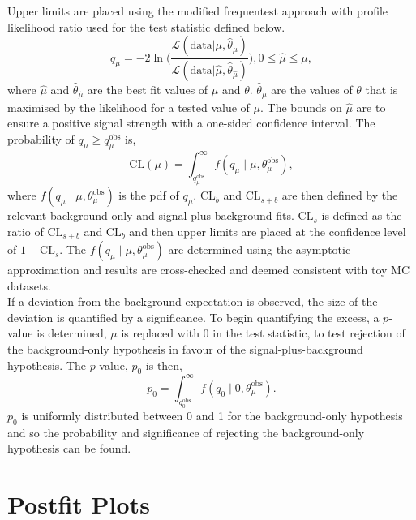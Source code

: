 Upper limits are placed using the modified frequentest approach \cite{Junk:1999kv,Read:2002hq} with profile likelihood ratio used for the test statistic defined below.
\begin{equation}
  q_{\mu} = -2 \ln \Biggl(\frac{\mathcal{L}(\text{data} | \mu, \hat{\theta}_{\mu})}{\mathcal{L}(\text{data} | \hat{\mu}, \hat{\theta}_{\hat{\mu}})}\Biggl), 0 \leq \hat{\mu} \leq \mu,
\end{equation}
where $\hat{\mu}$ and $\hat{\theta}_{\hat{\mu}}$ are the best fit values of $\mu$ and $\theta$. $\hat{\theta}_{\mu}$ are the values of $\theta$ that is maximised by the likelihood for a tested value of $\mu$.
The bounds on $\hat{\mu}$ are to ensure a positive signal strength with a one-sided confidence interval.
The probability of $q_{\mu} \geq q_{\mu}^{\text{obs}}$ is,
\begin{equation}
\text{CL}(\mu) = \int^{\infty}_{q_{\mu}^{\text{obs}}} f(q_{\mu} \mid \mu, \theta_{\mu}^{\text{obs}}),
\end{equation}
where $f(q_{\mu} \mid \mu, \theta_{\mu}^{\text{obs}})$ is the pdf of $q_\mu$.
$\text{CL}_{b}$ and $\text{CL}_{s+b}$ are then defined by the relevant background-only and signal-plus-background fits.
$\text{CL}_s$ is defined as the ratio of $\text{CL}_{s+b}$ and $\text{CL}_{b}$ and then upper limits are placed at the confidence level of $1-\text{CL}_{s}$.
The $f(q_{\mu} \mid \mu, \theta_{\mu}^{\text{obs}})$ are determined using the asymptotic approximation \cite{Cowan:2010js} and results are cross-checked and deemed consistent with toy MC datasets. \\

If a deviation from the background expectation is observed, the size of the deviation is quantified by a significance.
To begin quantifying the excess, a $p$-value is determined, $\mu$ is replaced with 0 in the test statistic, to test rejection of the background-only hypothesis in favour of the signal-plus-background hypothesis.
The $p$-value, $p_0$ is then,
\begin{equation}
p_{0} = \int^{\infty}_{q_{0}^{\text{obs}}} f(q_{0} \mid 0, \theta_{\mu}^{\text{obs}}).
\end{equation}
$p_{0}$ is uniformly distributed between 0 and 1 for the background-only hypothesis and so the probability and significance of rejecting the background-only hypothesis can be found. \\

\section{Postfit Plots}

